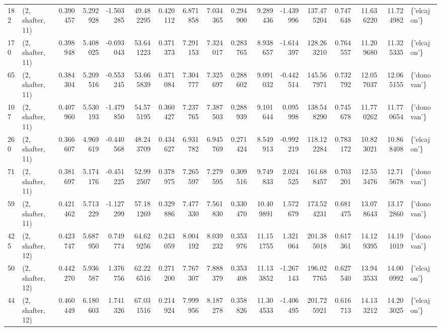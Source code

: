 \begin{tabular}{llrrrrrrrrrrrrrrl}
182 &  (2, shafter, 11) &   0.390457 &   5.292928 &  -1.503285 &    49.482295 &   0.420112 &   6.871858 &   7.034365 &  0.294900 &   9.289436 &  -1.439996 &   137.475204 &   0.747648 &  11.636220 &  11.724982 &  \{'elcajon'\} \\
170 &  (2, shafter, 11) &   0.398948 &   5.408025 &  -0.693043 &    53.641223 &   0.371373 &   7.291153 &   7.324017 &  0.283765 &   8.938657 &  -1.614397 &   128.263210 &   0.764557 &  11.209680 &  11.325335 &  \{'elcajon'\} \\
65  &  (2, shafter, 11) &   0.384304 &   5.209516 &  -0.553245 &    53.665839 &   0.371084 &   7.304777 &   7.325697 &  0.288602 &   9.091032 &  -0.442514 &   145.567971 &   0.732792 &  12.057037 &  12.065155 &  \{'donovan'\} \\
107 &  (2, shafter, 11) &   0.407960 &   5.530193 &  -1.479850 &    54.575195 &   0.360427 &   7.237765 &   7.387503 &  0.288939 &   9.101644 &   0.095998 &   138.548290 &   0.745678 &  11.770262 &  11.770654 &  \{'donovan'\} \\
260 &  (2, shafter, 11) &   0.366607 &   4.969619 &  -0.440568 &    48.243709 &   0.434627 &   6.931782 &   6.945769 &  0.271424 &   8.549913 &  -0.992219 &   118.122284 &   0.783172 &  10.823021 &  10.868408 &  \{'elcajon'\} \\
71  &  (2, shafter, 11) &   0.381697 &   5.174176 &  -0.451225 &    52.992507 &   0.378975 &   7.265597 &   7.279595 &  0.309516 &   9.749833 &   2.024525 &   161.688457 &   0.703201 &  12.553476 &  12.715678 &  \{'donovan'\} \\
59  &  (2, shafter, 11) &   0.421462 &   5.713229 &  -1.127299 &    57.181269 &   0.329886 &   7.477330 &   7.561830 &  0.330470 &  10.409891 &   1.572679 &   173.524231 &   0.681475 &  13.078643 &  13.172860 &  \{'donovan'\} \\
425 &  (2, shafter, 12) &   0.423747 &   5.687950 &   0.749774 &    64.629256 &   0.243059 &   8.004192 &   8.039232 &  0.353976 &  11.151755 &   1.321064 &   201.385018 &   0.617361 &  14.129395 &  14.191019 &  \{'donovan'\} \\
50  &  (2, shafter, 12) &   0.442270 &   5.936587 &   1.376756 &    62.226516 &   0.271200 &   7.767307 &   7.888379 &  0.353408 &  11.133852 &  -1.267143 &   196.027765 &   0.627540 &  13.943533 &  14.000992 &  \{'elcajon'\} \\
44  &  (2, shafter, 12) &   0.460449 &   6.180603 &   1.741326 &    67.031516 &   0.214924 &   7.999956 &   8.187278 &  0.358826 &  11.304533 &  -1.406495 &   201.725921 &   0.616713 &  14.133212 &  14.203025 &  \{'elcajon'\} \\

\end{tabular}
